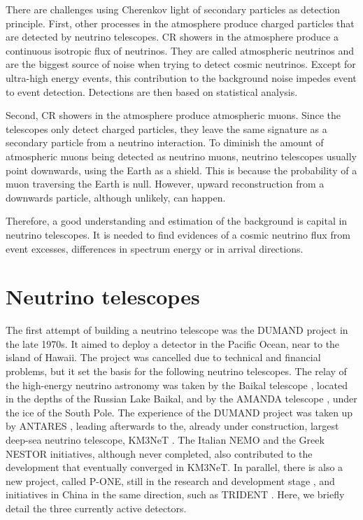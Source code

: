 There are challenges using Cherenkov light of secondary particles as detection principle. First, other processes in the atmosphere produce charged particles that are detected by neutrino telescopes. CR showers in the atmosphere produce a continuous isotropic flux of neutrinos. They are called atmospheric neutrinos and are the biggest source of noise when trying to detect cosmic neutrinos. Except for ultra-high energy events, this contribution to the background noise impedes event to event detection. Detections are then based on statistical analysis.

Second, CR showers in the atmosphere produce atmospheric muons. Since the telescopes only detect charged particles, they leave the same signature as a secondary particle from a neutrino interaction. To diminish the amount of atmospheric muons being detected as neutrino muons, neutrino telescopes usually point downwards, using the Earth as a shield. This is because the probability of a muon traversing the Earth is null. However, upward reconstruction from a downwards particle, although unlikely, can happen.

Therefore, a good understanding and estimation of the background is capital in neutrino telescopes. It is needed to find evidences of a cosmic neutrino flux from event excesses, differences in spectrum energy or in arrival directions.%


\section{Neutrino telescopes}

The first attempt of building a neutrino telescope was the DUMAND project \cite{Dumand} in the late 1970s. It aimed to deploy a detector in the Pacific Ocean, near to the island of Hawaii. The project was cancelled due to technical and financial problems, but it set the basis for the following neutrino telescopes. The relay of the high-energy neutrino astronomy was taken by the Baikal telescope \cite{Baikal1}, located in the depths of the Russian Lake Baikal, and by the AMANDA telescope \cite{Amanda}, under the ice of the South Pole. The experience of the DUMAND project was taken up by ANTARES \cite{Antares}, leading afterwards to the, already under construction, largest deep-sea neutrino telescope, KM3NeT \cite{km3net}. The Italian NEMO \cite{NEMO} and the Greek NESTOR \cite{NESTOR} initiatives, although never completed, also contributed to the development that eventually converged in KM3NeT. In parallel, there is also a new project, called P-ONE, still in the research and development stage \cite{Pone}, and initiatives in China in the same direction, such as TRIDENT \cite{TRIDENT}. Here, we briefly detail the three currently active detectors.

